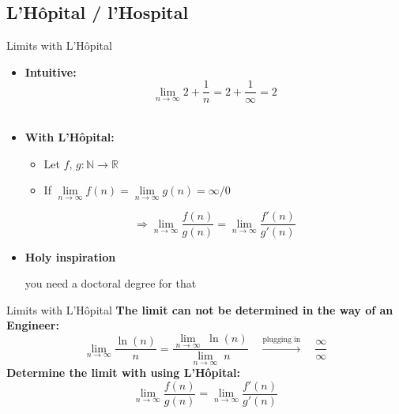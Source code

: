 \subsection{L'H\^{o}pital / l'Hospital}

\begin{frame}{Limits with L'H\^{o}pital}
  \begin{itemize}
    \item
      \textbf{Intuitive:}\\
      \begin{displaymath}
        \lim\limits_{n \rightarrow \infty} 2 + \dfrac{1}{n}
        = 2  + \dfrac{1}{\infty} = 2
      \end{displaymath}
      \vspace{0em}\\
    \item<2- |handout:1>
      \textbf{With L'H\^{o}pital:}
      \begin{itemize}
        \item
          Let $f, \, g : \mathbb{N} \rightarrow \mathbb{R}$
        \item
          If
          \begin{math}
            \lim\limits_{n \to \infty} f(n)
              = \lim\limits_{n \to \infty} g(n)
              = \infty / 0
          \end{math}
      \end{itemize}
      \begin{displaymath}
        \Rightarrow \lim\limits_{n \rightarrow \infty} \dfrac{f(n)}{g(n)}
          = \lim\limits_{n \rightarrow \infty} \dfrac{f'(n)}{g'(n)}
      \end{displaymath}
    \item<3- |handout:1>
      \textbf{Holy inspiration}
      \begin{center}
        you need a doctoral degree for that
      \end{center}
  \end{itemize}
\end{frame}


\begin{frame}{Limits with L'H\^{o}pital}
  \textbf{The limit can not be determined in the way of an Engineer:}
  \begin{displaymath}
    \lim_{n \to \infty} \dfrac{\ln (n)}{n}
      = \dfrac{\lim_{n \to \infty}\; \ln (n)}{\lim\limits_{n \to \infty}\; n}
    \hspace{1em} \stackrel{\text{plugging in}}{\longrightarrow} \hspace{1em}
      \dfrac{\infty}{\infty}
  \end{displaymath}
  \textbf{Determine the limit with using L'H\^{o}pital:}
  \begin{displaymath}
    \lim\limits_{n \rightarrow \infty} \dfrac{f(n)}{g(n)}
      = \lim\limits_{n \rightarrow \infty} \dfrac{f'(n)}{g'(n)}
  \end{displaymath}
\end{frame}

